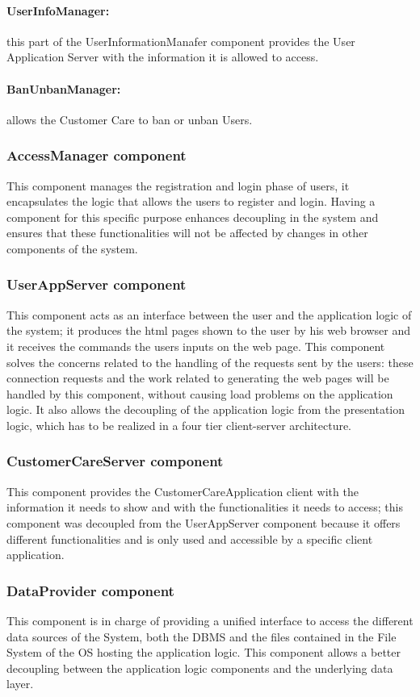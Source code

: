 \paragraph{UserInfoManager:} this part of the UserInformationManafer component provides the User Application Server with the information it is allowed to access.
\paragraph{BanUnbanManager:} allows the Customer Care to ban or unban Users.
\subsubsection{AccessManager component}
This component manages the registration and login phase of users, it encapsulates the logic that allows the users to register and login. Having a component for this specific purpose enhances decoupling in the system and ensures that these functionalities will not be affected by changes in other components of the system.

\subsubsection{UserAppServer component}
This component acts as an interface between the user and the application logic of the system; it produces the html pages shown to the user by his web browser and it receives the commands the users inputs on the web page. This component solves the concerns related to the handling of the requests sent by the users: these connection requests and the work related to generating the web pages will be handled by this component, without causing load problems on the application logic. It also allows the decoupling of the application logic from the presentation logic, which has to be realized in a four tier client-server architecture.

\subsubsection{CustomerCareServer component}
This component provides the CustomerCareApplication client with the information it needs to show and with the functionalities it needs to access; this component was decoupled from the UserAppServer component because it offers different functionalities and is only used and accessible by a specific client application.

\subsubsection{DataProvider component}
This component is in charge of providing a unified interface to access the different data sources of the System, both the DBMS and the files contained in the File System of the OS hosting the application logic. This component allows a better decoupling between the application logic components and the underlying data layer.

